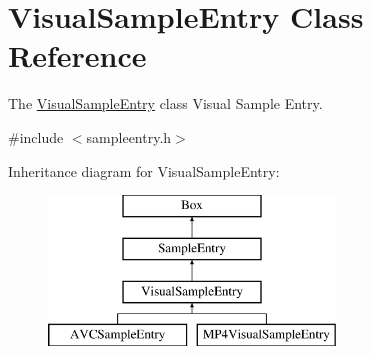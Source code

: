 \hypertarget{class_visual_sample_entry}{\section{Visual\-Sample\-Entry Class Reference}
\label{class_visual_sample_entry}
}


The \hyperlink{class_visual_sample_entry}{Visual\-Sample\-Entry} class Visual Sample Entry.  




{\ttfamily \#include $<$sampleentry.\-h$>$}

Inheritance diagram for Visual\-Sample\-Entry\-:\begin{figure}[H]
\begin{center}
\leavevmode
\includegraphics[height=4.000000cm]{class_visual_sample_entry}
\end{center}
\end{figure}
